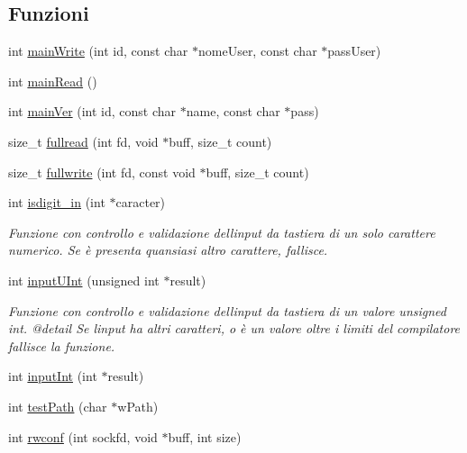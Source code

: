 \subsection*{Funzioni}
\begin{DoxyCompactItemize}
\item 
int \mbox{\hyperlink{a00050_a686fdc51e62cecfde609bd7635ac4b4b}{main\+Write}} (int id, const char $\ast$nome\+User, const char $\ast$pass\+User)
\item 
int \mbox{\hyperlink{a00050_ac5c53a5bcea0e6648c6564f0b5f5b6bd}{main\+Read}} ()
\item 
int \mbox{\hyperlink{a00050_a577f6318104d3678662cd68be1f76225}{main\+Ver}} (int id, const char $\ast$name, const char $\ast$pass)
\item 
size\+\_\+t \mbox{\hyperlink{a00050_aa6e2320d0a4267b15084f5eed8187380}{fullread}} (int fd, void $\ast$buff, size\+\_\+t count)
\item 
size\+\_\+t \mbox{\hyperlink{a00050_a07a5975e70c72acac6fb5c1a8a6ce6d4}{fullwrite}} (int fd, const void $\ast$buff, size\+\_\+t count)
\item 
int \mbox{\hyperlink{a00050_a0447d21c2e258f94e73a2df7cc5deeb3}{isdigit\+\_\+in}} (int $\ast$caracter)
\begin{DoxyCompactList}\small\item\em Funzione con controllo e validazione dell\textquotesingle{}input da tastiera di un solo carattere numerico. Se è presenta quansiasi altro carattere, fallisce. \end{DoxyCompactList}\item 
int \mbox{\hyperlink{a00050_ac8639575e0352679109d50fdf1d8a09b}{input\+U\+Int}} (unsigned int $\ast$result)
\begin{DoxyCompactList}\small\item\em Funzione con controllo e validazione dell\textquotesingle{}input da tastiera di un valore unsigned int. @detail Se l\textquotesingle{}input ha altri caratteri, o è un valore oltre i limiti del compilatore fallisce la funzione. \end{DoxyCompactList}\item 
int \mbox{\hyperlink{a00050_adf6dc76d411ca0f1202098a0a3aa2049}{input\+Int}} (int $\ast$result)
\item 
int \mbox{\hyperlink{a00050_ad53b7ea4b153982d90a2c13cc2712980}{test\+Path}} (char $\ast$w\+Path)
\item 
int \mbox{\hyperlink{a00050_ab2c6a8994eb18fd01ebda77f51847bab}{rwconf}} (int sockfd, void $\ast$buff, int size)
\item 

\end{DoxyCompactItemize}
